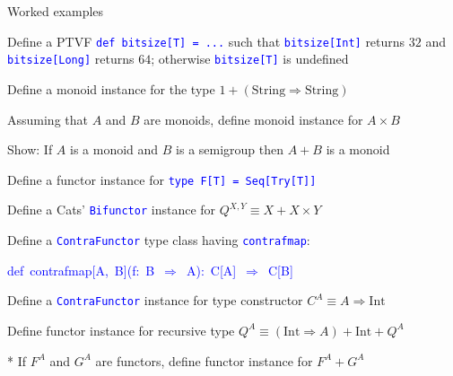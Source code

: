 \documentclass[english]{beamer}
\newenvironment{lyxcode}
   {\par\begin{list}{}{
     \setlength{\rightmargin}{\leftmargin}
     \setlength{\listparindent}{0pt}%
     \raggedright
     \setlength{\itemsep}{0pt}
     \setlength{\parsep}{0pt}
     \normalfont\ttfamily}%
    \def\{{\char`\{}
    \def\}{\char`\}}
    \def\textasciitilde{\char`\~}
    \item[]}
   {\end{list}}
\begin{document}
\begin{frame}{Worked examples}

\begin{enumerate}
\item Define a PTVF \texttt{\textcolor{blue}{\footnotesize{}def bitsize{[}T{]}
= ...}} such that \texttt{\textcolor{blue}{\footnotesize{}bitsize{[}Int{]}}}
returns $32$ and \texttt{\textcolor{blue}{\footnotesize{}bitsize{[}Long{]}}}
returns $64$; otherwise \texttt{\textcolor{blue}{\footnotesize{}bitsize{[}T{]}}}
is undefined
\item Define a monoid instance for the type $1+\left(\text{String}\Rightarrow\text{String}\right)$
\item Assuming that $A$ and $B$ are monoids, define monoid instance for
$A\times B$
\item Show: If $A$ is a monoid and $B$ is a semigroup then $A+B$ is a
monoid
\item Define a functor instance for \texttt{\textcolor{blue}{\footnotesize{}type
F{[}T{]} = Seq{[}Try{[}T{]}{]}}}{\footnotesize \par}
\item Define a Cats' \texttt{\textcolor{blue}{\footnotesize{}Bifunctor}}
instance for $Q^{X,Y}\equiv X+X\times Y$
\item Define a \texttt{\textcolor{blue}{\footnotesize{}ContraFunctor}} type
class having \texttt{\textcolor{blue}{\footnotesize{}contrafmap}}:
\begin{lyxcode}
\textcolor{blue}{\footnotesize{}def~contrafmap{[}A,~B{]}(f:~B~$\Rightarrow$~A):~C{[}A{]}~$\Rightarrow$~C{[}B{]}}{\footnotesize \par}
\end{lyxcode}
Define a \texttt{\textcolor{blue}{\footnotesize{}ContraFunctor}} instance
for type constructor $C^{A}\equiv A\Rightarrow\text{Int}$
\item Define functor instance for recursive type $Q^{A}\equiv\left(\text{Int}\Rightarrow A\right)+\text{Int}+Q^{A}$
\item {*} If $F^{A}$ and $G^{A}$ are functors, define functor instance
for $F^{A}+G^{A}$
\end{enumerate}
\end{frame}
\end{document}
